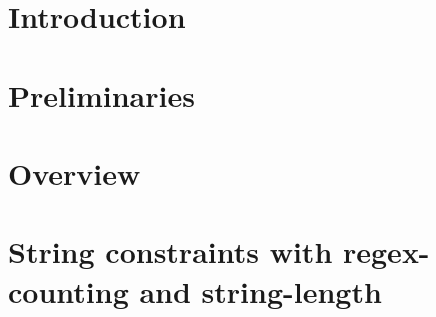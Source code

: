 \documentclass[preprint,12pt]{elsarticle}
\newcommand{\zhilin}[1]{\color{orange}\textbf{ZL:} #1 \textbf{:LZ}\color{black}}
\begin{document}
\begin{frontmatter}





\end{frontmatter}


\section{Introduction} \label{sec:intro}


\section{Preliminaries} \label{sec:pre}


\section{Overview} \label{sec:overview}


\section{String constraints with regex-counting and string-length}\label{sec:recl}

\end{document}
